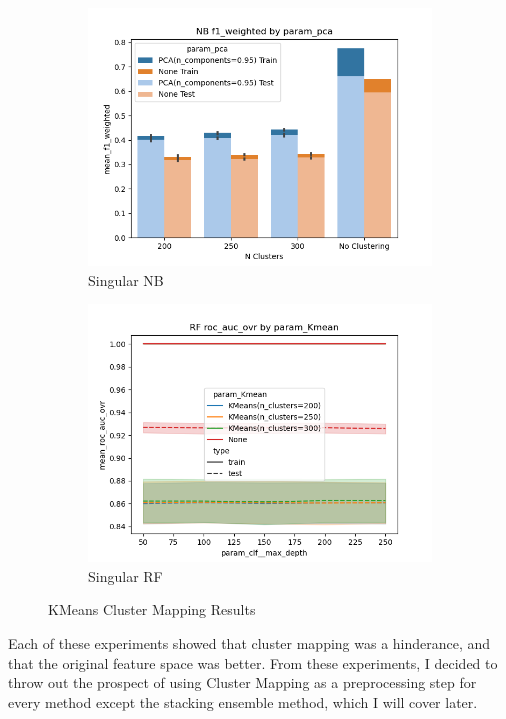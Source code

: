 \documentclass[12pt]{article}
\begin{document}
\begin{figure}
\begin{subfigure}{.5\textwidth}
      \includegraphics[width=.95\textwidth]{../../results_Experiment5_Final_No_Agg/nb/param_pca_f1_weighted_param_Kmean.png}
      \caption{Singular NB}
      \end{subfigure}%
    \begin{subfigure}{.5\textwidth}
      \includegraphics[width=.95\textwidth]{../../results_Experiment5_Final_No_Agg/rf/param_Kmean_roc_auc_ovr_param_clf__max_depth.png}
      \caption{Singular RF}
    \end{subfigure}
    \caption{KMeans Cluster Mapping Results}
    \label{figure1}
\end{figure}

Each of these experiments showed that cluster mapping was a hinderance, and that the original feature space was better. 
From these experiments, I decided to throw out the prospect of using Cluster Mapping as a preprocessing step for every method except the 
stacking ensemble method, which I will cover later.
\end{document}
